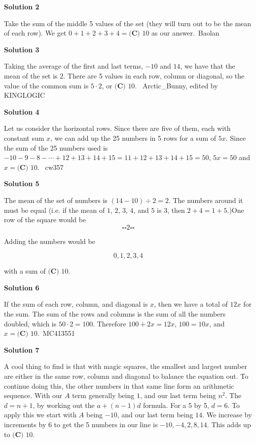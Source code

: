 \begin{enumerate}
 



\textbf{Solution 2}

Take the sum of the middle 5 values of the set (they will turn out to be the mean of each row). We get $0 + 1 + 2 + 3 + 4 = \boxed{\textbf{(C) } 10}$ as our answer.~Baolan

 



\textbf{Solution 3}

Taking the average of the first and last terms, $-10$ and $14$, we have that the mean of the set is $2$. There are 5 values in each row, column or diagonal, so the value of the common sum is $5\cdot2$, or $\boxed{\textbf{(C) } 10}$. ~Arctic\_Bunny, edited by KINGLOGIC

 



\textbf{Solution 4}

Let us consider the horizontal rows.  Since there are five of them, each with constant sum $x$, we can add up the 25 numbers in 5 rows for a sum of $5x$.  Since the sum of the 25 numbers used is $-10-9-8-\cdots{}+12+13+14+15=11+12+13+14+15=50$, $5x=50$ and $x=\boxed{\textbf{(C) }10}$. ~cw357

 



\textbf{Solution 5}

The mean of the set of numbers is $(14-10) \div 2 = 2$. The numbers around it must be equal (i.e. if the mean of $1$, $2$, $3$, $4$, and $5$ is $3$, then $2+4=1+5$.)One row of the square would be 
 \[\square  \square  2  \square  \square\]

 Adding the numbers would be 

 
 \[0, 1, 2, 3, 4\]

 with a sum of $\boxed {\textbf {(C) }10}$.

 


 



\textbf{Solution 6}

If the sum of each row, column, and diagonal is $x$, then we have a total of $12x$ for the sum. The sum of the rows and columns is the sum of all the numbers doubled, which is $50\cdot2=100$. Therefore $100+2x=12x$, $100=10x$, and $x=\boxed {\textbf {(C) }10}$.~MC413551

 



\textbf{Solution 7}

A cool thing to find is that with magic squares, the smallest and largest number are either in the same row, column and diagonal to balance the equation out. To continue doing this, the other numbers in that same line form an arithmetic sequence. With our $A$ term generally being $1$, and our last term being $n^2$. The $d = n+1$, by working out the $a+(n-1)d$ formula. For a 5 by 5, $d = 6$. To apply this we start with $A$ being $-10$, and our last term being $14$. We increase by increments by $6$ to get the 5 numbers in our line is $-10, -4, 2, 8, 14$. This adds up to $\boxed {\textbf {(C) }10}$.


\end{enumerate}
